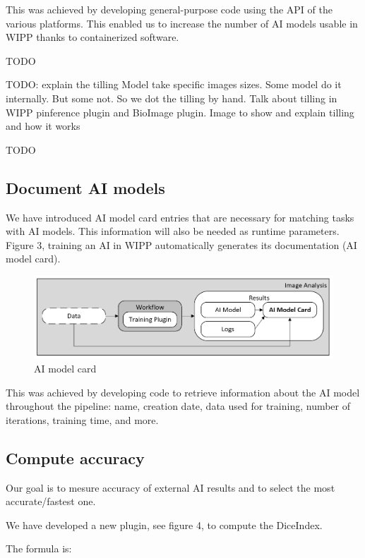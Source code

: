 This was achieved by developing general-purpose code using the API of
the various platforms. This
enabled us to increase the number of AI models usable
in WIPP thanks to containerized software.

TODO

TODO: explain the tilling
Model take specific images sizes.
Some model do it internally.
But some not.
So we dot the tilling by hand.
Talk about tilling in WIPP pinference plugin and BioImage plugin.
Image to show and explain tilling and how it works

TODO

\subsection{Document AI models}

We have introduced AI model card entries that are necessary for matching tasks
with AI models. This information will also be needed as runtime parameters.
Figure 3, training an AI in WIPP automatically generates its documentation
(AI model card).

\begin{figure}[H]
  \centering
  \includegraphics[width=1.0\linewidth]{png/methods/ai_model_card.png}
  \caption{AI model card}
  \label{fig:3aimodelcard}
\end{figure}

This was achieved by developing code to retrieve information about the AI model
throughout the pipeline: name, creation date, data used for training, number of
iterations, training time, and more.

\subsection{Compute accuracy}

Our goal is to mesure accuracy of external AI results and to select the most
accurate/fastest one.

We have developed a new plugin, see figure 4, to compute the \Gls{DiceIndex}.

The formula is:

